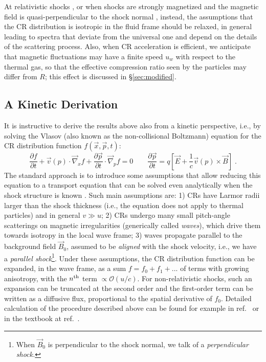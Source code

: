 \documentclass[varenna]{cimento}
\newcommand{\de}{\partial}
\begin{document}
At relativistic shocks \cite{blasi-vietri05,morlino+07a}, or when shocks are strongly magnetized and the magnetic field is quasi-perpendicular to the shock normal \cite{kirk+96,bell+13}, instead, the assumptions that the CR distribution is isotropic in the fluid frame should be relaxed, in general leading to spectra that deviate from the universal one and depend on the details of the scattering process.
Also, when CR acceleration is efficient, we anticipate that magnetic fluctuations may have a finite speed $u_w$ with respect to the thermal gas, so that the effective compression ratio seen by the particles may differ from $R$; this effect is discussed in \S\ref{sec:modified}.

\subsection{A Kinetic Derivation}
It is instructive to derive the results above also from a kinetic perspective, i.e., by solving the Vlasov (also known as the non-collisional Boltzmann) equation for the CR distribution function $f(\vec{x},\vec{p},t)$:
\begin{equation}
	\frac{\de f}{\de t}+\vec v(p)\cdot \vec{\nabla}_x f+\frac{\de \vec p}{\de t}\cdot \vec{\nabla}_p f=0\qquad\frac{\de \vec p}{\de t}=q\left[\vec E+\frac{1}{c}\vec v(p)\times\vec B\right]\;.
\end{equation}
The standard approach is to introduce some assumptions that allow reducing this equation to a transport equation that can be solved even analytically when the shock structure is known \cite{skilling75a,skilling75b,skilling75c,amato+05,caprioli+09a,caprioli+10a,caprioli+10c,caprioli12,diesing+21}.
Such main assumptions are:
1) CRs have Larmor radii larger than the shock thickness (i.e., the equation does not apply to thermal particles) and in general $v\gg u$;
2) CRs undergo many small pitch-angle scatterings on magnetic irregularities (generically called \emph{waves}), which drive them towards isotropy in the local wave frame;
3) waves propagate parallel to the background field $\vec{B}_0$, assumed to be \emph{aligned} with the shock velocity, i.e., we have a \emph{parallel shock}\footnote{When $\vec{B}_0$ is perpendicular to the shock normal, we talk of a \emph{perpendicular shock.}}.
Under these assumptions, the CR distribution function can be expanded, in the wave frame, as a sum $f=f_0+f_1+...$ of terms with growing anisotropy, with the $n^{\rm th}$ term $\propto\mathcal{O}(u/c)$. 
For non-relativistic shocks, such an expansion can be truncated at the second order and the first-order term can be written as a diffusive flux, proportional to the spatial derivative of $f_0$.
Detailed calculation of the procedure described above can be found for example in ref.~\cite{skilling75a} or in the textbook at ref.~\cite{vietri}. 
\end{document}
